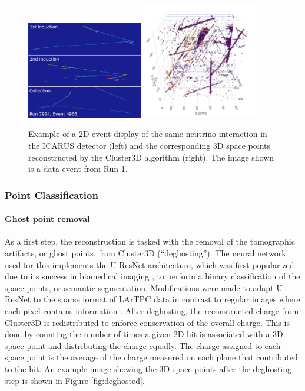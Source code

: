 \begin{figure}
    \centering
    \includegraphics[width=0.45\textwidth]{figures/mlreco/mlreco_2d.jpg}
    \includegraphics[width=0.45\textwidth]{figures/mlreco/mlreco_cluster3d.jpg}
    \caption{Example of a 2D event display of the same neutrino interaction in the ICARUS detector (left) and the corresponding 3D space points reconstructed by the Cluster3D algorithm (right). The image shown is a data event from Run 1.}
    \label{fig:cluster3d}
\end{figure}

\subsubsection{Point Classification}
\label{sec:point_classification}

\paragraph{Ghost point removal}
As a first step, the reconstruction is tasked with the removal of the tomographic artifacts, or ghost points, from Cluster3D (``deghosting''). The neural network used for this implements the U-ResNet architecture, which was first popularized due to its success in biomedical imaging \cite{Ronneberger2015}, to perform a binary classification of the space points, or semantic segmentation. Modifications were made to adapt U-ResNet to the sparse format of LArTPC data in contrast to regular images where each pixel contains information \cite{Domine2020b}. After deghosting, the reconstructed charge from Cluster3D is redistributed to enforce conservation of the overall charge. This is done by counting the number of times a given 2D hit is associated with a 3D space point and distributing the charge equally. The charge assigned to each space point is the average of the charge measured on each plane that contributed to the hit. An example image showing the 3D space points after the deghosting step is shown in Figure \ref{fig:deghosted}.


